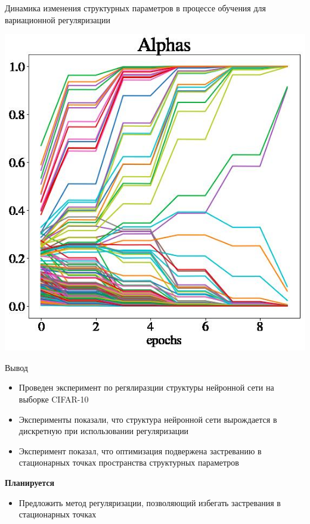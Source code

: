 \documentclass[10pt]{beamer}
\begin{document}
\begin{frame}{Динамика изменения структурных параметров в процессе обучения для вариационной регуляризации}

\centering
\includegraphics[width=0.6\linewidth]{alphas_variable.jpeg}
\caption{}
\label{}

\end{frame}

\begin{frame}{Вывод}

\begin{itemize}
	\item Проведен эксперимент по регялиразции структуры нейронной сети на выборке CIFAR-10
	\item Эксперименты показали, что структура нейронной сети вырождается в дискретную при использовании регуляризации
	\item Эксперимент показал, что оптимизация подвержена застреванию в стационарных точках пространства структурных параметров
\end{itemize}

{\bf Планируется}\\
	\begin{itemize}
		\item Предложить метод регуляризации, позволяющий избегать застревания в стационарных точках
	\end{itemize}

\end{frame}
\end{document}

